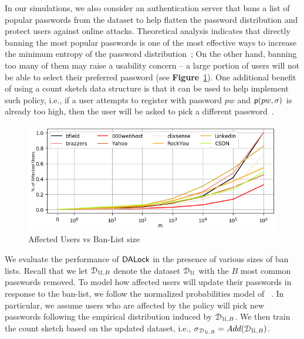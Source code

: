  In our simulations, we also consider an authentication server that bans a list of popular passwords from the dataset to help flatten the password distribution and protect users against online attacks. Theoretical analysis indicates that directly banning the most popular passwords is one of the most effective ways to increase the minimum entropy of the password distribution~\cite{BKPS:ACMEC13}; On the other hand, banning too many of them may raise a usability concern – a large portion of users {will not be able to select their preferred password} (see \textbf{Figure}~\ref{figure: affectedusers}). One additional benefit of using a count sketch data structure is that it can be used to help implement such policy, i.e., if a user attempts to register with password $pw$ and $\textsf{p}(pw,\sigma)$ is already too high, then the user will be asked to pick a different password~\cite{HTS:SchHerMit10}.

\begin{figure}[htb]	
	\begin{center}
		\vspace{-0.4cm}
		\includegraphics[width=\linewidth]{Figures/Experiments/AffectedUsers}
		\vspace{-0.4cm}
		\caption{Affected Users vs Ban-List size}\label{figure: affectedusers}
		\vspace{-0.45cm}
	\end{center}
\end{figure}

We evaluate the performance of $\mathsf{DALock}$ in the presence of various sizes of ban lists. Recall that we let $\mathcal{D}_{{\mathcal{U}, B}}$ denote the dataset $\mathcal{D}_{{\mathcal{U}}}$ with the $B$ most common passwords removed. To model how affected users will update their passwords in response to the ban-list, we follow the normalized probabilities model of ~\cite{BKPS:ACMEC13}. In particular, we assume users who are affected by the policy will pick new passwords following the empirical distribution induced by $\mathcal{D}_{{\mathcal{U}, B}}$. We then train the count sketch based on the updated dataset, i.e., $\sigma_{\mathcal{D}_{{\mathcal{U}, B}}} = Add(\mathcal{D}_{{\mathcal{U}, B}})$.


